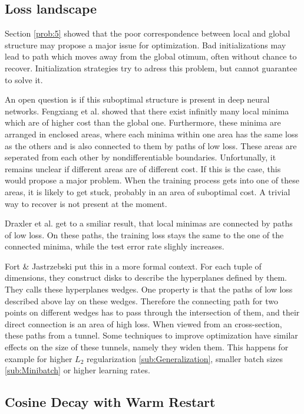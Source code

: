 \subsection{Loss landscape}\label{loss_landscape}
Section \ref{prob:5} showed that the poor correspondence between local
and global structure may propose a major issue for optimization. Bad
initializations may lead to path which moves away from the global otimum, often
without chance to recover. Initialization strategies try to adress this problem,
but cannot guarantee to solve it.

An open question is if this suboptimal structure is present in deep neural
networks. Fengxiang et al. \cite{he2020piecewise} showed that there exist
infinitly many local minima which are of higher cost than the global one.
Furthermore, these minima are arranged in enclosed areas, where each minima
within one area has the same loss as the others and is also connected to them by
paths of low loss. These areas are seperated from each other by
nondifferentiable boundaries. Unfortunally, it remains unclear if different areas 
are of different cost. If this is the case, this would propose a major problem.
When the training process gets into one of these areas, it is likely to get
stuck, probably in an area of suboptimal cost. A trivial way to recover is not
present at the moment.

Draxler et al. \cite{draxler2018essentially} get to a smiliar result, that local
minimas are connected by paths of low loss. On these paths, the training loss stays the
same to the one of the connected minima, while the test error rate slighly
increases.

Fort \& Jastrzebski \cite{fort2019large} put this in a more formal context. For
each tuple of dimensions, they construct disks to describe the hyperplanes
defined by them. They calls these hyperplanes wedges. One property is that the
paths of low loss described above lay on these wedges. Therefore the
connecting path for two points on different wedges has to pass through the
intersection of them, and their direct connection is an area of high loss.
When viewed from an cross-section, these paths from a tunnel. Some techniques
to improve optimization have similar effects on the size of these tunnels,
namely they widen them. This happens for example for higher $L_2$ regularization
\ref{sub:Generalization}, smaller batch sizes \ref{sub:Minibatch} or higher
learning rates.


\subsection{Cosine Decay with Warm Restart}\label{sub:cosine_decay}

